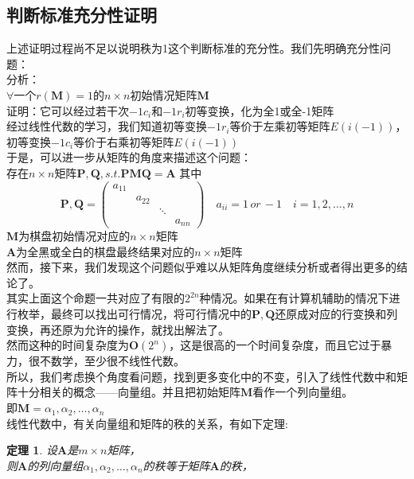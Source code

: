\documentclass[UTF-8,a4paper]{ctexart}
\newtheorem{theorem}[subsubsection]{定理}
\begin{document}
\subsection{判断标准充分性证明}
\songti
上述证明过程尚不足以说明秩为1这个判断标准的充分性。我们先明确充分性问题：
\kaishu
\\分析：
\\ \(\forall\)一个\(r(\mathbf{M})=1\)的\(n \times n\)初始情况矩阵\(\mathbf{M}\)
\\证明：它可以经过若干次\(-1c_i\)和\(-1r_i\)初等变换，化为全1或全-1矩阵
\\ \songti 经过线性代数的学习，我们知道初等变换\(-1r_i\)等价于左乘初等矩阵\(E(i(-1))\)，初等变换\(-1c_i\)等价于右乘初等矩阵\(E(i(-1))\)
\\于是，可以进一步从矩阵的角度来描述这个问题：
\kaishu
\\存在\(n \times n\)矩阵\(\mathbf{P}, \mathbf{Q},s.t. \mathbf{P}\mathbf{M}\mathbf{Q}=\mathbf{A}\)
其中\[\mathbf{P},\mathbf{Q}=\begin{pmatrix}
    a_{11}
    \\&a_{22}
    \\&& \ddots
    \\ &&& a_{nn}
\end{pmatrix} \quad
a_{ii}= 1\,or\,-1 \quad
i = 1,2,\dots,n
\]
\(\mathbf{M}\)为棋盘初始情况对应的\(n \times n\)矩阵
\\\(\mathbf{A}\)为全黑或全白的棋盘最终结果对应的\(n \times n\)矩阵
\songti
\\然而，接下来，我们发现这个问题似乎难以从矩阵角度继续分析或者得出更多的结论了。
\\其实上面这个命题一共对应了有限的\(2^{2n}\)种情况。如果在有计算机辅助的情况下进行枚举，最终可以找出可行情况，将可行情况中的\(\mathbf{P},\mathbf{Q}\)还原成对应的行变换和列变换，再还原为允许的操作，就找出解法了。
\\然而这种的时间复杂度为\(\mathbf{O}(2^n)\)，这是很高的一个时间复杂度，而且它过于暴力，很不数学，至少很不线性代数。
\\所以，我们考虑换个角度看问题，找到更多变化中的不变，引入了线性代数中和矩阵十分相关的概念——向量组。并且把初始矩阵\(\mathbf{M}\)看作一个列向量组。
\\即\(\mathbf{M}=\alpha_1,\alpha_2,\dots,\alpha_n\)
\kaishu
\\线性代数中，有关向量组和矩阵的秩的关系，有如下定理:
\begin{theorem}
    \label{vectorR}
    设\(\mathbf{A}\)是\(m \times n\)矩阵，\\则\(\mathbf{A}\)的列向量组\(\alpha_1,\alpha_2,\dots,\alpha_n\)的秩等于矩阵\(\mathbf{A}\)的秩，
\end{theorem}
\end{document}
